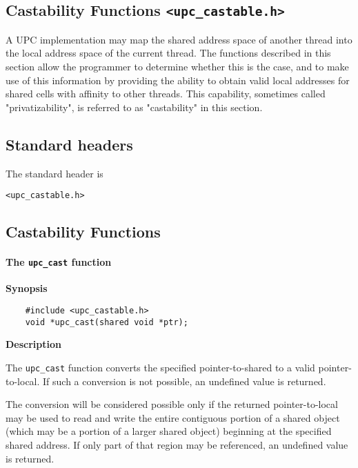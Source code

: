 \subsection{Castability Functions {\tt <upc\_castable.h>}}
\label{upc-castable}

\np A UPC implementation may map the shared address space of another
thread into the local address space of the current thread.  The
functions described in this section allow the programmer to determine
whether this is the case, and to make use of this information by
providing the ability to obtain valid local addresses for shared cells
with affinity to other threads.  This capability, sometimes called
"privatizability", is referred to as "castability" in this section.

\subsection{Standard headers}

\np The standard header is

{\tt <upc\_castable.h>}

\subsection{Castability Functions}

\paragraph{The {\tt upc\_cast} function}

{\bf Synopsis}

\npf\vspace{-2.5em}
\begin{verbatim}
    #include <upc_castable.h>
    void *upc_cast(shared void *ptr);
\end{verbatim}

{\bf Description}

\np The {\tt upc\_cast} function converts the specified
pointer-to-shared to a valid pointer-to-local.  If such a conversion
is not possible, an undefined value is returned.

The conversion will be considered possible only if the returned
pointer-to-local may be used to read and write the entire contiguous
portion of a shared object (which may be a portion of a larger shared
object) beginning at the specified shared address.  If only part of that
region may be referenced, an undefined value is returned.

